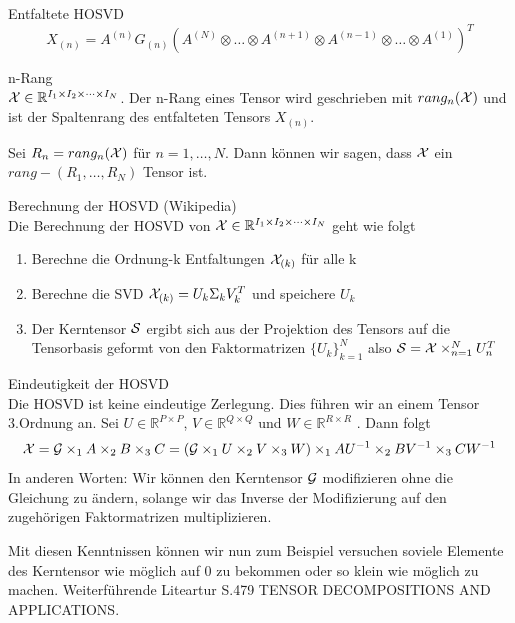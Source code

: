 \begin{Bemerkung} Entfaltete HOSVD \\
\begin{equation}
X_{(n)} = A^{(n)} G_{(n)} ( A^{(N)} \otimes \dots \otimes A^{(n+1)} \otimes A^{(n-1)} \otimes \dots \otimes A^{(1)} )^{T}
\end{equation}
\end{Bemerkung}

\begin{Definition} n-Rang \\
 ${\cal X}  \in \mathbb{R}^{I_1 \times I_2 \times \dots \times I_N}$. Der n-Rang eines Tensor wird geschrieben mit $rang_n({\cal X})$ und ist der Spaltenrang des entfalteten Tensors $X_{(n)}$.
\end{Definition}

\begin{Bemerkung}
Sei $R_n = rang_n({\cal X})$ für $n=1, \dots, N$. Dann können wir sagen, dass ${\cal X}$ ein $rang-(R_1,\dots,R_N)$ Tensor ist.
\end{Bemerkung}

\begin{Bemerkung} Berechnung der HOSVD (Wikipedia) \\
Die Berechnung der HOSVD von ${\cal X}  \in \mathbb{R}^{I_1 \times I_2 \times \dots \times I_N}$ geht wie folgt
\begin{enumerate}
\item Berechne die Ordnung-k Entfaltungen ${\cal X}_{(k)}$ für alle k
\item Berechne die SVD ${\cal X}_{(k)}=U_k \Sigma_k V_k^T$ und speichere $U_k$
\item Der Kerntensor ${\cal S}$ ergibt sich aus der Projektion des Tensors auf die Tensorbasis geformt von den Faktormatrizen  $\{ U_k\}_{k=1}^{N}$  also ${\cal S}={\cal X} \times_{n=1}^{N} U_n^T$
\end{enumerate}
\end{Bemerkung}

\begin{Bemerkung} Eindeutigkeit der HOSVD \\
Die HOSVD ist keine eindeutige Zerlegung. Dies führen wir an einem Tensor 3.Ordnung an. Sei $U \in \mathbb{R}^{P \times P}$, $V \in \mathbb{R}^{Q \times Q}$  und $W \in \mathbb{R}^{R \times R}$ . Dann folgt
\begin{equation}
{\cal X} = {\cal G} \times_1 A \times_2 B \times_3 C = ({\cal G} \times_1 U \times_2 V \times_3 W) \times_1 AU^{-1} \times_2 BV^{-1} \times_3 CW^{-1}
\end{equation}
In anderen Worten: Wir können den Kerntensor ${\cal G}$ modifizieren ohne die Gleichung zu ändern, solange wir das Inverse der Modifizierung auf den zugehörigen Faktormatrizen multiplizieren.
\end{Bemerkung}

Mit diesen Kenntnissen können wir nun zum Beispiel versuchen soviele Elemente des Kerntensor wie möglich auf 0 zu bekommen oder so klein wie möglich zu machen.
Weiterführende Liteartur S.479 TENSOR DECOMPOSITIONS AND APPLICATIONS.

